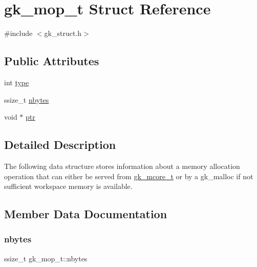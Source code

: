 \hypertarget{structgk__mop__t}{}\section{gk\+\_\+mop\+\_\+t Struct Reference}
\label{structgk__mop__t}


{\ttfamily \#include $<$gk\+\_\+struct.\+h$>$}

\subsection*{Public Attributes}
\begin{DoxyCompactItemize}
\item 
int \hyperlink{structgk__mop__t_a26d63dcd8e95d56959ef1c6f8ef37c6b}{type}
\item 
ssize\+\_\+t \hyperlink{structgk__mop__t_a2b766c120002f4e58d0a1e50e61822f4}{nbytes}
\item 
void $\ast$ \hyperlink{structgk__mop__t_a3333a1078416780e6a38189db93af2fd}{ptr}
\end{DoxyCompactItemize}


\subsection{Detailed Description}
The following data structure stores information about a memory allocation operation that can either be served from \hyperlink{structgk__mcore__t}{gk\+\_\+mcore\+\_\+t} or by a gk\+\_\+malloc if not sufficient workspace memory is available. 

\subsection{Member Data Documentation}
\mbox{\label{structgk__mop__t_a2b766c120002f4e58d0a1e50e61822f4}} 
\subsubsection{\texorpdfstring{nbytes}{nbytes}}
{\footnotesize\ttfamily ssize\+\_\+t gk\+\_\+mop\+\_\+t\+::nbytes}

\mbox{\label{structgk__mop__t_a3333a1078416780e6a38189db93af2fd}} 
